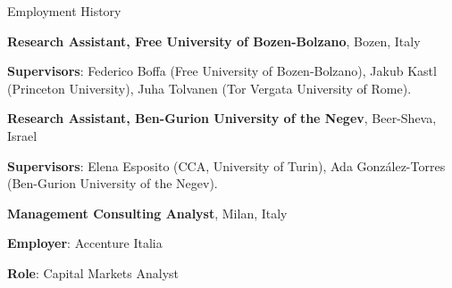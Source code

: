 \begin{rubric}{Employment History}

%
	\textbf{Research Assistant, Free University of Bozen-Bolzano}, Bozen, Italy  \par 
 \textbf{Supervisors}: Federico Boffa (Free University of Bozen-Bolzano), Jakub Kastl (Princeton University), Juha Tolvanen (Tor Vergata University of Rome). \par

	\textbf{Research Assistant, Ben-Gurion University of the Negev}, Beer-Sheva, Israel  \par
 \textbf{Supervisors}: Elena Esposito (CCA, University of Turin), Ada González-Torres (Ben-Gurion University of the Negev). \par


%
	\textbf{Management Consulting Analyst}, Milan, Italy  \par 
\textbf{Employer}: Accenture Italia \par
\textbf{Role}: Capital Markets Analyst





%
%

%
\end{rubric}